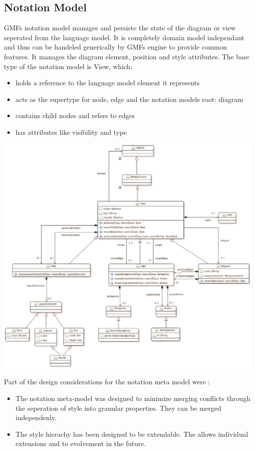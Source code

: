 \subsection{Notation Model}
GMFs notation model manages and persiste the state of the diagram or view seperated from the language model. It is completely domain model independant and thus can be handeled generically by GMFs engine to provide common features. It manages the diagram element, position and style attributes. \cite{EMP} The base type of the notation model is View, which:
\begin{itemize}
	\item holds a reference to the language model element it represents 
	\item acts as the supertype for node, edge and the notation models root: diagram
	\item contains child nodes and refers to edges
	\item has attributes like visibility and type
\end{itemize}

\begin{center}
\includegraphics[scale=0.5]{gfx/NotationMM.png}
\end{center}

Part of the design considerations for the notation meta model were \cite{GMFDoc}:
\begin{itemize}
	\item The notation meta-model was designed to minimize merging conflicts through the seperation of style into granular properties. They can be merged independenly.
	\item The style hierachy has been designed to be extendable. The allows individual extensions and to evolvement in the future. 
\end{itemize}

